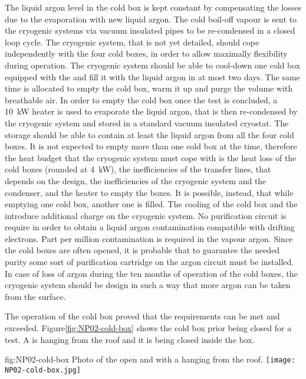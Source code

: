The liquid argon level in the cold box is kept constant by compensating the losses due to the evaporation with new liquid argon.
The cold boil-off vapour is sent to the cryogenic systems via vacuum insulated pipes to be re-condensed in a closed loop cycle.
The cryogenic system, that is not yet detailed, should cope independently with the four cold boxes, in order to allow maximally flexibility during operation.
The cryogenic system should be able to cool-down one cold box equipped with the  and fill it with the liquid argon in at most two days.
The same time is allocated to empty the cold box, warm it up and purge the volume with breathable air.
In order to empty the cold box once the test is concluded, a 10~kW heater is used to evaporate the liquid argon, that is then re-condensed by the cryogenic system and stored in a standard vacuum insulated cryostat.
The storage should be able to contain at least the liquid argon from all the four cold boxes.
It is not expected to empty more than one cold box at the time, therefore the heat budget that the cryogenic system must cope with is the heat loss of the cold boxes (rounded at 4~kW), the inefficiencies of the transfer lines, that depends on the design, the inefficiencies of the cryogenic system and the condenser, and the heater to empty the boxes.
It is possible, instead, that while emptying one cold box, another one is filled.
The cooling of the cold box and the  introduce additional charge on the cryogenic system.
No purification circuit is require in order to obtain a liquid argon contamination compatible with drifting electrons.
Part per million contamination is required in the vapour argon.
Since the cold boxes are often opened, it is probable that to guarantee the needed purity some sort of purification cartridge on the argon circuit must be installed.
In case of loss of argon during the ten months of operation of the cold boxes, the cryogenic system should be design in such a way that more argon can be taken from the surface.

The operation of the  cold box proved that the requirements can be met and exceeded.
Figure\ref{fig:NP02-cold-box} shows the  cold box prior being closed for a test.
A  is hanging from the roof and it is being closed inside the box.
\begin{dunefigure}{fig:NP02-cold-box}
{Photo of the  \coldbox open and with a  hanging from the roof.}
\texttt{[image: NP02-cold-box.jpg]}
\end{dunefigure}

